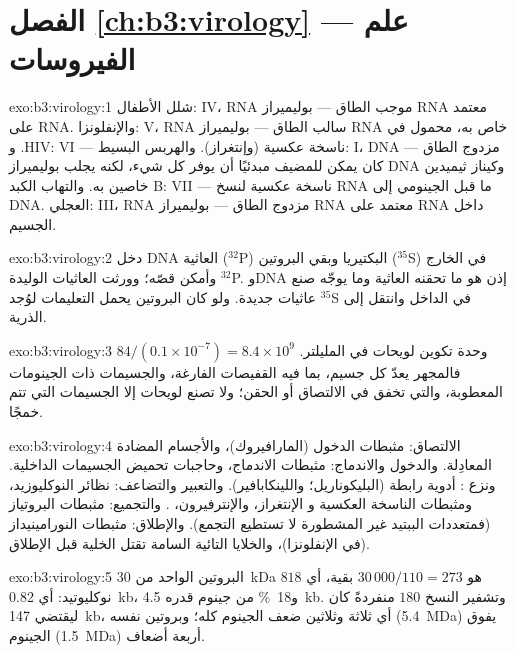 \section*{الفصل \ref{ch:b3:virology} --- علم الفيروسات}

\begin{solution}{exo:b3:virology:1}
شلل الأطفال: IV، RNA موجب الطاق --- بوليميراز RNA معتمد على RNA.
والإنفلونزا: V، RNA سالب الطاق --- بوليميراز RNA خاص به، محمول في
. وHIV: VI --- ناسخة عكسية (وإنتغراز). والهربس
البسيط: I، DNA مزدوج الطاق --- كان يمكن للمضيف مبدئيًا أن يوفر
كل شيء، لكنه يجلب بوليميراز DNA وكيناز ثيميدين خاصين به.
والتهاب الكبد B: VII --- ناسخة عكسية لنسخ RNA ما قبل الجينومي
إلى DNA.  العجلي: III، RNA مزدوج الطاق --- بوليميراز RNA معتمد على RNA
داخل الجسيم.
\end{solution}

\begin{solution}{exo:b3:virology:2}
دخل DNA العاثية ($^{32}$P) البكتيريا وبقي البروتين
($^{35}$S) في الخارج وأمكن قصّه؛ وورثت العاثيات الوليدة
$^{32}$P. وDNA إذن هو ما تحقنه العاثية وما
يوجّه صنع عاثيات جديدة. ولو كان البروتين يحمل التعليمات
لوُجد $^{35}$S في الداخل وانتقل إلى الذرية.
\end{solution}

\begin{solution}{exo:b3:virology:3}
$84/(0.1\times 10^{-7}) = 8.4\times 10^{9}$ وحدة تكوين لويحات في المليلتر.
فالمجهر يعدّ كل جسيم، بما فيه القفيصات الفارغة، والجسيمات
ذات الجينومات المعطوبة، والتي تخفق في الالتصاق أو الحقن؛ ولا تصنع
لويحات إلا الجسيمات التي تتم خمجًا.
\end{solution}

\begin{solution}{exo:b3:virology:4}
الالتصاق: مثبطات الدخول (المارافيروك)، والأجسام المضادة المعادِلة.
والدخول والاندماج: مثبطات الاندماج، وحاجبات تحميض الجسيمات الداخلية.
ونزع : أدوية رابطة  (البليكوناريل؛ واللينكابافير). والتعبير
والتضاعف: نظائر النوكليوزيد، ومثبطات الناسخة العكسية و
الإنتغراز، والإنترفيرون، . والتجميع: مثبطات
البروتياز (فمتعددات الببتيد غير المشطورة لا تستطيع التجمع). والإطلاق:
مثبطات النورامينيداز (في الإنفلونزا)، والخلايا التائية السامة تقتل
الخلية قبل الإطلاق.
\end{solution}

\begin{solution}{exo:b3:virology:5}
البروتين الواحد من \qty{30}{kDa} هو $30\,000/110 = 273$ بقية، أي $818$
نوكليوتيد: أي \qty{0.82}{kb}، و\qty{18}{\%} من جينوم قدره \qty{4.5}{kb}.
وتشفير النسخ $180$ منفردةً كان ليقتضي \qty{147}{kb}،
أي ثلاثة وثلاثين ضعف الجينوم كله؛ وبروتين  نفسه
(\qty{5.4}{MDa}) يفوق الجينوم (\qty{1.5}{MDa}) أربعة أضعاف.
\end{solution}


